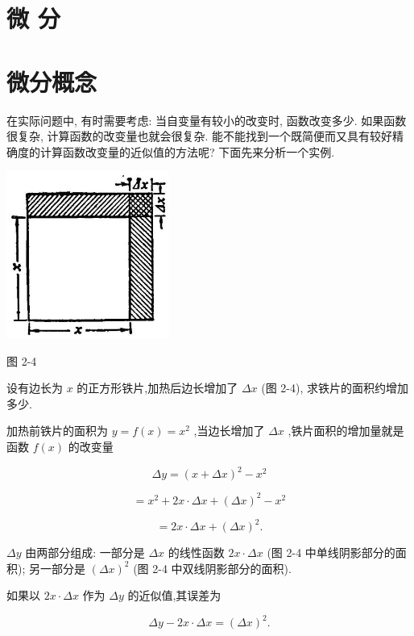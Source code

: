 \documentclass[lang=cn,newtx,12pt,scheme=chinese]{elegantbook}
\begin{document}
\section*{微 分}

\section{微分概念}

在实际问题中, 有时需要考虑: 当自变量有较小的改变时, 函数改变多少. 如果函数很复杂, 计算函数的改变量也就会很复杂. 能不能找到一个既简便而又具有较好精确度的计算函数改变量的近似值的方法呢? 下面先来分析一个实例.

\begin{center}
\includegraphics[max width=0.4\textwidth]{images/01912c18-5c3f-733d-b775-749ba9897a9d_110_353714.jpg}
\end{center}

图 2-4

设有边长为 \(x\) 的正方形铁片,加热后边长增加了 \({\Delta x}\) (图 2-4), 求铁片的面积约增加多少.

加热前铁片的面积为 \(y = f\left( x\right) = {x}^{2}\) ,当边长增加了 \({\Delta x}\) ,铁片面积的增加量就是函数 \(f\left( x\right)\) 的改变量

\[
{\Delta y} = {\left( x + \Delta x\right) }^{2} - {x}^{2}
\]

\[
= {x}^{2} + {2x} \cdot {\Delta x} + {\left( \Delta x\right) }^{2} - {x}^{2}
\]

\[
= {2x} \cdot {\Delta x} + {\left( \Delta x\right) }^{2}\text{.} \tag{1}
\]

\({\Delta y}\) 由两部分组成: 一部分是 \({\Delta x}\) 的线性函数 \({2x} \cdot {\Delta x}\) (图 2-4 中单线阴影部分的面积); 另一部分是 \({\left( \Delta x\right) }^{2}\) (图 2-4 中双线阴影部分的面积).

如果以 \({2x} \cdot {\Delta x}\) 作为 \({\Delta y}\) 的近似值,其误差为

\[
{\Delta y} - {2x} \cdot {\Delta x} = {\left( \Delta x\right) }^{2}.
\]
\end{document}
